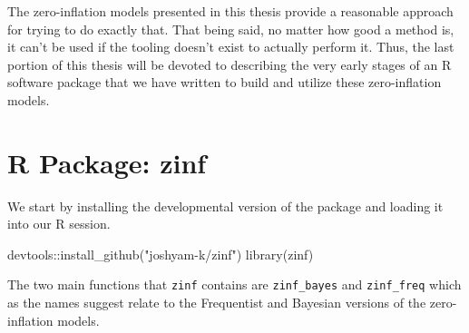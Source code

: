 \documentclass[12pt,twoside]{reedthesis}
\newenvironment{Shaded}{\begin{snugshade}}{\end{snugshade}}
\newcommand{\FunctionTok}[1]{\textcolor[rgb]{0.00,0.00,0.00}{#1}}
\newcommand{\NormalTok}[1]{#1}
\newcommand{\SpecialCharTok}[1]{\textcolor[rgb]{0.00,0.00,0.00}{#1}}
\newcommand{\StringTok}[1]{\textcolor[rgb]{0.31,0.60,0.02}{#1}}
\begin{document}
The zero-inflation models presented in this thesis provide a reasonable approach for trying to do exactly that. That being said, no matter how good a method is, it can't be used if the tooling doesn't exist to actually perform it. Thus, the last portion of this thesis will be devoted to describing the very early stages of an R software package that we have written to build and utilize these zero-inflation models.

\hypertarget{r-package-zinf}{%
\section{R Package: zinf}\label{r-package-zinf}}

We start by installing the developmental version of the package and loading it into our R session.
\begin{Shaded}
\begin{Highlighting}[]
\NormalTok{devtools}\SpecialCharTok{::}\FunctionTok{install\_github}\NormalTok{(}\StringTok{"joshyam{-}k/zinf"}\NormalTok{)}
\FunctionTok{library}\NormalTok{(zinf)}
\end{Highlighting}
\end{Shaded}
The two main functions that \texttt{zinf} contains are \texttt{zinf\_bayes} and \texttt{zinf\_freq} which as the names suggest relate to the Frequentist and Bayesian versions of the zero-inflation models.
\end{document}
